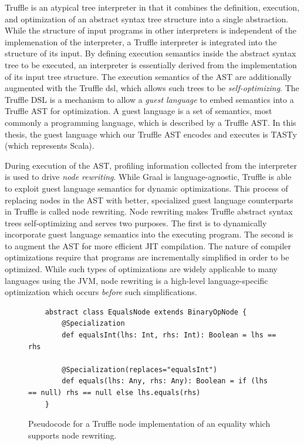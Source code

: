 Truffle is an atypical tree interpreter in that it combines the definition, execution, and optimization of an abstract syntax tree structure into a single abstraction.
While the structure of input programs in other interpreters is independent of the implemenation of the interpreter, a Truffle interpreter is integrated into the structure of its input.
By defining execution semantics inside the abstract syntax tree to be executed, an interpreter is essentially derived from the implementation of its input tree structure.
The execution semantics of the AST are additionally augmented with the Truffle \acrfull{dsl}, which allows such trees to be \textit{self-optimizing}.
The Truffle DSL is a mechanism to allow a \textit{guest language} to embed semantics into a Truffle AST for optimization.
A guest language is a set of semantics, most commonly a programming language, which is described by a Truffle AST.
In this thesis, the guest language which our Truffle AST encodes and executes is TASTy (which represents Scala).

During execution of the AST, profiling information collected from the interpreter is used to drive \textit{node rewriting}.
While Graal is language-agnostic, Truffle is able to exploit guest language semantics for dynamic optimizations.
This process of replacing nodes in the AST with better, specialized guest language counterparts in Truffle is called node rewriting.
Node rewriting makes Truffle abstract syntax trees self-optimizing and serves two purposes.
The first is to dynamically incorporate guest language semantics into the executing program.
The second is to augment the AST for more efficient JIT compilation.
The nature of compiler optimizations require that programs are incrementally simplified in order to be optimized.
While such types of optimizations are widely applicable to many languages using the JVM, node rewriting is a high-level language-specific optimization which occurs \textit{before} such simplifications.

\begin{figure}[!htb]
	\begin{verbatim}
	abstract class EqualsNode extends BinaryOpNode {
		@Specialization
		def equalsInt(lhs: Int, rhs: Int): Boolean = lhs == rhs
		
		@Specialization(replaces="equalsInt")
		def equals(lhs: Any, rhs: Any): Boolean = if (lhs == null) rhs == null else lhs.equals(rhs)
	}
	\end{verbatim}
	\caption{Pseudocode for a Truffle node implementation of an equality which supports node rewriting.}
	\label{example:node-rewriting}
\end{figure}

